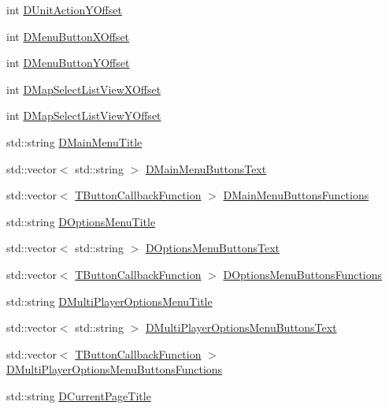 \begin{DoxyCompactItemize}
int \hyperlink{classCApplicationData_a8ccfb55bd25cba0e6eb66573ba9c8b3c}{D\+Unit\+Action\+Y\+Offset}
\item 
int \hyperlink{classCApplicationData_a04283b17a8c04af8325de4304a848095}{D\+Menu\+Button\+X\+Offset}
\item 
int \hyperlink{classCApplicationData_a63012360d0a98eef89707a503f4379a8}{D\+Menu\+Button\+Y\+Offset}
\item 
int \hyperlink{classCApplicationData_aa5a89b442e384acdf1c2aefc7ce4233b}{D\+Map\+Select\+List\+View\+X\+Offset}
\item 
int \hyperlink{classCApplicationData_ae1a8eb3fff3cf5bc236564925bec1c8c}{D\+Map\+Select\+List\+View\+Y\+Offset}
\item 
std\+::string \hyperlink{classCApplicationData_a2b0ca036562d2af6eca3ee4a6e2330f8}{D\+Main\+Menu\+Title}
\item 
std\+::vector$<$ std\+::string $>$ \hyperlink{classCApplicationData_a1e1c9f4434847c50210c0b36ff475f78}{D\+Main\+Menu\+Buttons\+Text}
\item 
std\+::vector$<$ \hyperlink{main_8cpp_af91bc223ea3fea871af009bfef33c595}{T\+Button\+Callback\+Function} $>$ \hyperlink{classCApplicationData_a9f9c3de6840e902711636257640a8e91}{D\+Main\+Menu\+Buttons\+Functions}
\item 
std\+::string \hyperlink{classCApplicationData_a1e73e21e92eb68c1cfc0c4bcae8196df}{D\+Options\+Menu\+Title}
\item 
std\+::vector$<$ std\+::string $>$ \hyperlink{classCApplicationData_aa9201da5408887973cb56fb1671ad6f8}{D\+Options\+Menu\+Buttons\+Text}
\item 
std\+::vector$<$ \hyperlink{main_8cpp_af91bc223ea3fea871af009bfef33c595}{T\+Button\+Callback\+Function} $>$ \hyperlink{classCApplicationData_a4c9516d20be17a9c9d5c1119736037e5}{D\+Options\+Menu\+Buttons\+Functions}
\item 
std\+::string \hyperlink{classCApplicationData_aa9c4883274c2313743a42b68c7fc427f}{D\+Multi\+Player\+Options\+Menu\+Title}
\item 
std\+::vector$<$ std\+::string $>$ \hyperlink{classCApplicationData_a400aa1df18482fe5d9f34e861a0dc257}{D\+Multi\+Player\+Options\+Menu\+Buttons\+Text}
\item 
std\+::vector$<$ \hyperlink{main_8cpp_af91bc223ea3fea871af009bfef33c595}{T\+Button\+Callback\+Function} $>$ \hyperlink{classCApplicationData_ad32d3cc90fd1ead1574cb6c336257e1c}{D\+Multi\+Player\+Options\+Menu\+Buttons\+Functions}
\item 
std\+::string \hyperlink{classCApplicationData_a49ce7f0b5891f0f2c29b73aad636b761}{D\+Current\+Page\+Title}

\end{DoxyCompactItemize}
